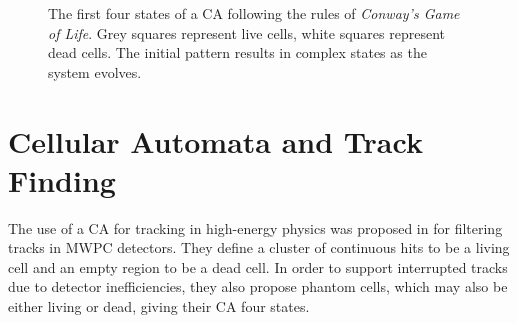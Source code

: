 \begin{figure}
\centering
{}
\caption[Example of state evolution in \emph{Conway's Game of Life}]{\label{fig:ca_life_four_steps}The first four states of a \ac{CA} following the rules of \emph{Conway's Game of Life}. Grey squares represent live cells, white squares represent dead cells. The initial pattern results in complex states as the system evolves.}
\end{figure}

\section{Cellular Automata and Track Finding}\label{sec:cellularautomaton_history}
The use of a \ac{CA} for tracking in high-energy physics was proposed in \citep{Glazov1992} for filtering tracks in \ac{MWPC} detectors. They define a cluster of continuous hits to be a living cell and an empty region to be a dead cell. In order to support interrupted tracks due to detector inefficiencies, they also propose phantom cells, which may also be either living or dead, giving their \ac{CA} four states.

